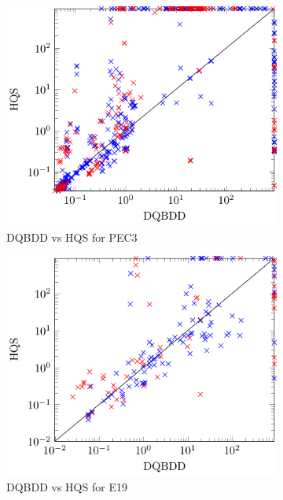 \documentclass[
  digital, %
  color,
  twoside, %
  table,   %
  nolof,     %
  nolot,     %
]{fithesis3}
\theoremstyle{definition}
\theoremstyle{remark}
\begin{document}
\begin{figure}[p]
  \begin{subfigure}{0.48\textwidth}
    \centering
    \includegraphics[width=\linewidth]{figures/PEC3dqbddVShqsSatUnsat.pdf}
    \caption{DQBDD vs HQS for PEC3}
    \label{fig:PEC3dqbddVShqs}
  \end{subfigure}
  \begin{subfigure}{0.48\textwidth}
    \centering
    \includegraphics[width=\linewidth]{figures/E19dqbddVShqsSatUnsat.pdf}
    \caption{DQBDD vs HQS for E19}
    \label{fig:E19dqbddVShqs}
  \end{subfigure}
  \begin{subfigure}{0.48\textwidth}

\end{subfigure}
\end{figure}
\end{document}

